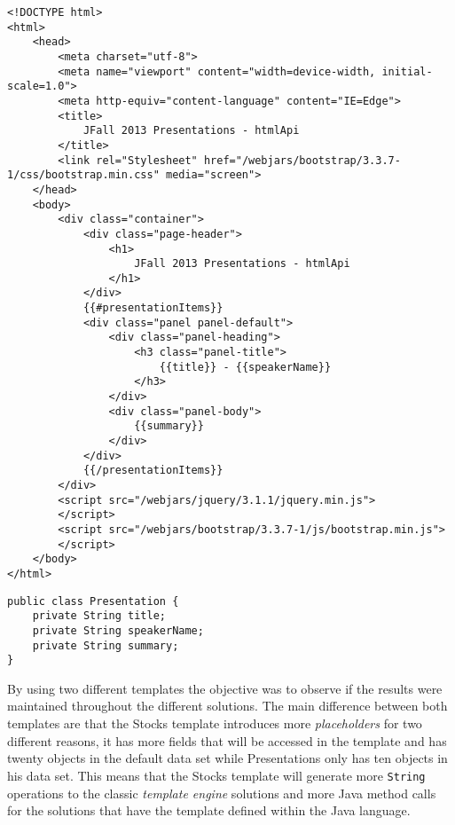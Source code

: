 \bigskip


\begin{lstlisting}[caption={Presentations Template using the Mustache Idiom},captionpos=b,label={lst:mustachepresentationstemplate}]
<!DOCTYPE html>
<html>
	<head>
		<meta charset="utf-8">
		<meta name="viewport" content="width=device-width, initial-scale=1.0">
		<meta http-equiv="content-language" content="IE=Edge">
		<title>
			JFall 2013 Presentations - htmlApi
		</title>
		<link rel="Stylesheet" href="/webjars/bootstrap/3.3.7-1/css/bootstrap.min.css" media="screen">
	</head>
	<body>
		<div class="container">
			<div class="page-header">
				<h1>
					JFall 2013 Presentations - htmlApi
				</h1>
			</div>
			{{#presentationItems}}
			<div class="panel panel-default">
				<div class="panel-heading">
					<h3 class="panel-title">
						{{title}} - {{speakerName}}
					</h3>
				</div>
				<div class="panel-body">
					{{summary}}
				</div>
			</div>
			{{/presentationItems}}
		</div>
		<script src="/webjars/jquery/3.1.1/jquery.min.js">
		</script>
		<script src="/webjars/bootstrap/3.3.7-1/js/bootstrap.min.js">
		</script>
	</body>
</html>
\end{lstlisting}

\bigskip


\begin{minipage}{\linewidth}
\begin{lstlisting}[caption={Presentation Data Type},captionpos=b,label={lst:presentation}]
public class Presentation {
    private String title;
    private String speakerName;
    private String summary;
}
\end{lstlisting}
\end{minipage}

\noindent
By using two different templates the objective was to observe if the results were maintained throughout the different solutions. The main difference between both templates are that the Stocks template introduces more \textit{placeholders} for two different reasons, it has more fields that will be accessed in the template and has twenty objects in the default data set while Presentations only has ten objects in his data set. This means that the Stocks template will generate more \texttt{String} operations to the classic \textit{template engine} solutions and more Java method calls for the solutions that have the template defined within the Java language.  

